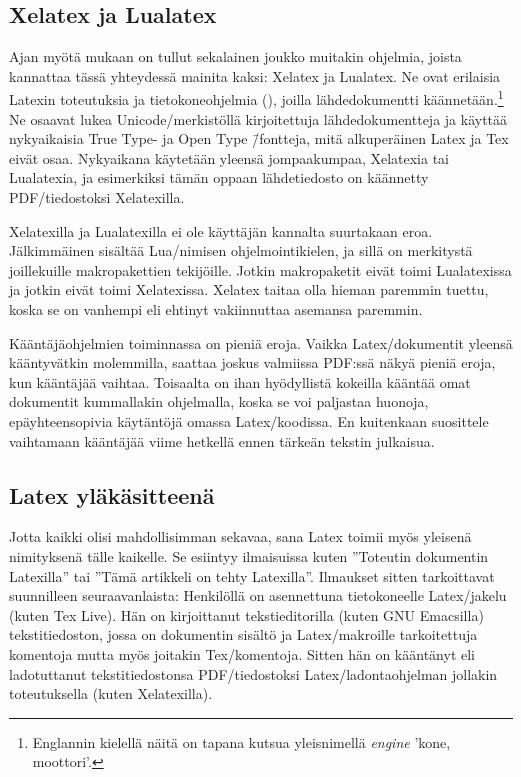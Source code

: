 \subsection{Xelatex ja Lualatex}

Ajan myötä mukaan on tullut sekalainen joukko muitakin ohjelmia, joista
kannattaa tässä yhteydessä mainita kaksi: Xelatex ja Lualatex. Ne ovat
erilaisia Latexin toteutuksia ja tietokone\-ohjelmia (), joilla lähdedokumentti käännetään.\footnote{Englannin
  kielellä näitä on tapana kutsua yleisnimellä
  \emph{\textenglish{engine}} 'kone, moottori'.} Ne osaavat lukea
Unicode\-/merkistöllä kirjoitettuja lähdedokumentteja ja käyttää
nyky\-aikaisia True Type- ja Open Type \=/fontteja, mitä alkuperäinen
Latex ja Tex eivät osaa. Nyky\-aikana käytetään yleensä jompaakumpaa,
Xelatexia tai Lualatexia, ja esimerkiksi tämän oppaan lähdetiedosto on
käännetty PDF\-/tiedostoksi Xelatexilla.

Xelatexilla ja Lualatexilla ei ole käyttäjän kannalta suurtakaan eroa.
Jälkimmäinen sisältää Lua\-/nimisen ohjelmointikielen, ja sillä on
merkitystä joillekuille makropakettien tekijöille. Jotkin makropaketit
eivät toimi Lualatexissa ja jotkin eivät toimi Xelatexissa. Xelatex
taitaa olla hieman paremmin tuettu, koska se on vanhempi eli ehtinyt
vakiinnuttaa asemansa paremmin.

Kääntäjäohjelmien toiminnassa on pieniä eroja. Vaikka Latex\-/dokumentit
yleensä kääntyvätkin molemmilla, saattaa joskus valmiissa PDF:ssä näkyä
pieniä eroja, kun kääntäjää vaihtaa. Toisaalta on ihan hyödyllistä
kokeilla kääntää omat dokumentit kummallakin ohjelmalla, koska se voi
paljastaa huonoja, epäyhteensopivia käytäntöjä omassa Latex\-/koodissa.
En kuitenkaan suosittele vaihtamaan kääntäjää viime hetkellä ennen
tärkeän tekstin julkaisua.

\subsection{Latex yläkäsitteenä}

Jotta kaikki olisi mahdollisimman sekavaa, sana Latex toimii myös
yleisenä nimityksenä tälle kaikelle. Se esiintyy ilmaisuissa kuten
''Toteutin dokumentin Latexilla'' tai ''Tämä artikkeli on tehty
Latexilla''. Ilmaukset sitten tarkoittavat suunnilleen seuraavanlaista:
Henkilöllä on asennettuna tietokoneelle Latex\-/jakelu (kuten Tex Live).
Hän on kirjoittanut tekstieditorilla (kuten GNU Emacsilla)
tekstitiedoston, jossa on dokumentin sisältö ja Latex\-/makroille
tarkoitettuja komentoja mutta myös joitakin Tex\-/komentoja. Sitten hän
on kääntänyt eli ladotuttanut tekstitiedostonsa PDF\-/tiedostoksi
Latex\-/ladontaohjelman jollakin toteutuksella (kuten Xelatexilla).

